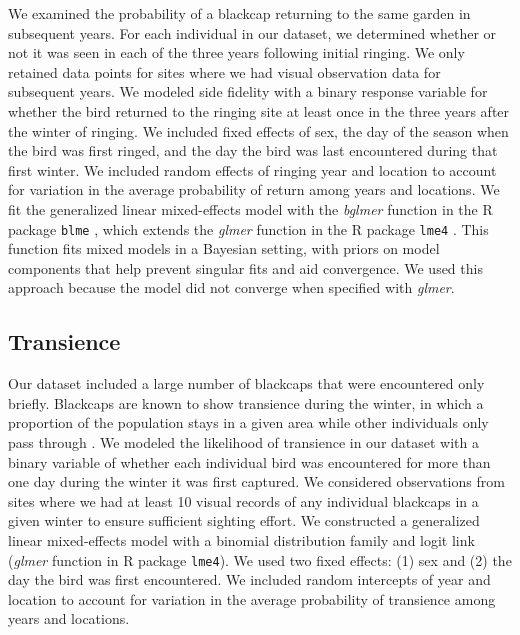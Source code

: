 \documentclass[a4paper, nobind]{templates/ociamthesis}
\begin{document}
We examined the probability of a blackcap returning to the same garden in subsequent years. For each individual in our dataset, we determined whether or not it was seen in each of the three years following initial ringing. We only retained data points for sites where we had visual observation data for subsequent years. We modeled side fidelity with a binary response variable for whether the bird returned to the ringing site at least once in the three years after the winter of ringing. We included fixed effects of sex, the day of the season when the bird was first ringed, and the day the bird was last encountered during that first winter. We included random effects of ringing year and location to account for variation in the average probability of return among years and locations. We fit the generalized linear mixed-effects model with the \emph{bglmer} function in the R package \texttt{blme} \autocite{chungNondegeneratePenalizedLikelihood2013}, which extends the \emph{glmer} function in the R package \texttt{lme4} \autocite{batesFittingLinearMixedeffects2015}. This function fits mixed models in a Bayesian setting, with priors on model components that help prevent singular fits and aid convergence. We used this approach because the model did not converge when specified with \emph{glmer}.

\hypertarget{transience}{%
\subsection{Transience}\label{transience}}

Our dataset included a large number of blackcaps that were encountered only briefly. Blackcaps are known to show transience during the winter, in which a proportion of the population stays in a given area while other individuals only pass through \autocite{beldaResidentTransientDynamics2007,cuadradoYearYearRecurrence1992}. We modeled the likelihood of transience in our dataset with a binary variable of whether each individual bird was encountered for more than one day during the winter it was first captured. We considered observations from sites where we had at least 10 visual records of any individual blackcaps in a given winter to ensure sufficient sighting effort. We constructed a generalized linear mixed-effects model with a binomial distribution family and logit link (\emph{glmer} function in R package \texttt{lme4}). We used two fixed effects: (1) sex and (2) the day the bird was first encountered. We included random intercepts of year and location to account for variation in the average probability of transience among years and locations.
\end{document}

